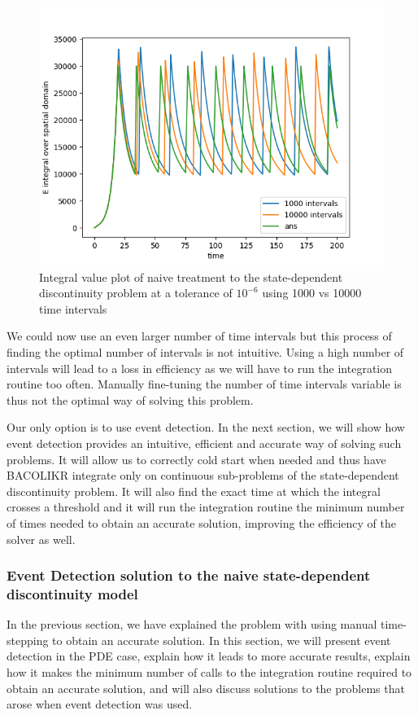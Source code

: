 \documentclass{article}
\begin{document}
\begin{figure}[H]
\centering
\includegraphics[width=0.7\linewidth]{./figures/pde_state_disc_naive_1000vs10000}
\caption{Integral value plot of naive treatment to the state-dependent discontinuity problem at a tolerance of $10^{-6}$ using 1000 vs 10000 time intervals}
\label{fig:pde_state_disc_naive_1000vs10000}
\end{figure}

We could now use an even larger number of time intervals but this process of finding the optimal number of intervals is not intuitive. Using a high number of intervals will lead to a loss in efficiency as we will have to run the integration routine too often. Manually fine-tuning the number of time intervals variable is thus not the optimal way of solving this problem. 

Our only option is to use event detection. In the next section, we will show how event detection provides an intuitive, efficient and accurate way of solving such problems. It will allow us to correctly cold start when needed and thus have BACOLIKR integrate only on continuous sub-problems of the state-dependent discontinuity problem. It will also find the exact time at which the integral crosses a threshold and it will run the integration routine the minimum number of times needed to obtain an accurate solution, improving the efficiency of the solver as well.

\subsubsection{Event Detection solution to the naive state-dependent discontinuity model}
\label{subsubsection:pde_state_event_detection}
In the previous section, we have explained the problem with using manual time-stepping to obtain an accurate solution. In this section, we will present event detection in the PDE case, explain how it leads to more accurate results, explain how it makes the minimum number of calls to the integration routine required to obtain an accurate solution, and will also discuss solutions to the problems that arose when event detection was used.
\end{document}

